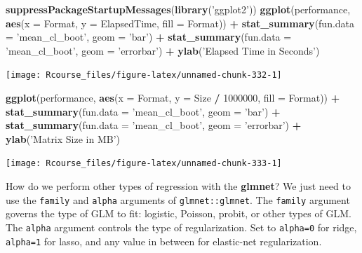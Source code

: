 \documentclass[]{book}
\newenvironment{Shaded}{\begin{snugshade}}{\end{snugshade}}
\newcommand{\KeywordTok}[1]{\textcolor[rgb]{0.13,0.29,0.53}{\textbf{#1}}}
\newcommand{\DataTypeTok}[1]{\textcolor[rgb]{0.13,0.29,0.53}{#1}}
\newcommand{\DecValTok}[1]{\textcolor[rgb]{0.00,0.00,0.81}{#1}}
\newcommand{\StringTok}[1]{\textcolor[rgb]{0.31,0.60,0.02}{#1}}
\newcommand{\OperatorTok}[1]{\textcolor[rgb]{0.81,0.36,0.00}{\textbf{#1}}}
\newcommand{\NormalTok}[1]{#1}
\theoremstyle{definition}
\theoremstyle{definition}
\theoremstyle{definition}
\theoremstyle{remark}
\begin{document}
\begin{Shaded}
\begin{Highlighting}[]
\KeywordTok{suppressPackageStartupMessages}\NormalTok{(}\KeywordTok{library}\NormalTok{(}\StringTok{'ggplot2'}\NormalTok{))}
\KeywordTok{ggplot}\NormalTok{(performance, }\KeywordTok{aes}\NormalTok{(}\DataTypeTok{x =}\NormalTok{ Format, }\DataTypeTok{y =}\NormalTok{ ElapsedTime, }\DataTypeTok{fill =}\NormalTok{ Format)) }\OperatorTok{+}
\StringTok{  }\KeywordTok{stat_summary}\NormalTok{(}\DataTypeTok{fun.data =} \StringTok{'mean_cl_boot'}\NormalTok{, }\DataTypeTok{geom =} \StringTok{'bar'}\NormalTok{) }\OperatorTok{+}
\StringTok{  }\KeywordTok{stat_summary}\NormalTok{(}\DataTypeTok{fun.data =} \StringTok{'mean_cl_boot'}\NormalTok{, }\DataTypeTok{geom =} \StringTok{'errorbar'}\NormalTok{) }\OperatorTok{+}
\StringTok{  }\KeywordTok{ylab}\NormalTok{(}\StringTok{'Elapsed Time in Seconds'}\NormalTok{) }
\end{Highlighting}
\end{Shaded}

\texttt{[image: Rcourse\_files/figure-latex/unnamed-chunk-332-1]}

\begin{Shaded}
\begin{Highlighting}[]
\KeywordTok{ggplot}\NormalTok{(performance, }\KeywordTok{aes}\NormalTok{(}\DataTypeTok{x =}\NormalTok{ Format, }\DataTypeTok{y =}\NormalTok{ Size }\OperatorTok{/}\StringTok{ }\DecValTok{1000000}\NormalTok{, }\DataTypeTok{fill =}\NormalTok{ Format)) }\OperatorTok{+}
\StringTok{  }\KeywordTok{stat_summary}\NormalTok{(}\DataTypeTok{fun.data =} \StringTok{'mean_cl_boot'}\NormalTok{, }\DataTypeTok{geom =} \StringTok{'bar'}\NormalTok{) }\OperatorTok{+}
\StringTok{  }\KeywordTok{stat_summary}\NormalTok{(}\DataTypeTok{fun.data =} \StringTok{'mean_cl_boot'}\NormalTok{, }\DataTypeTok{geom =} \StringTok{'errorbar'}\NormalTok{) }\OperatorTok{+}
\StringTok{  }\KeywordTok{ylab}\NormalTok{(}\StringTok{'Matrix Size in MB'}\NormalTok{) }
\end{Highlighting}
\end{Shaded}

\texttt{[image: Rcourse\_files/figure-latex/unnamed-chunk-333-1]}

How do we perform other types of regression with the \textbf{glmnet}? We
just need to use the \texttt{family} and \texttt{alpha} arguments of
\texttt{glmnet::glmnet}. The \texttt{family} argument governs the type
of GLM to fit: logistic, Poisson, probit, or other types of GLM. The
\texttt{alpha} argument controls the type of regularization. Set to
\texttt{alpha=0} for ridge, \texttt{alpha=1} for lasso, and any value in
between for elastic-net regularization.
\end{document}
